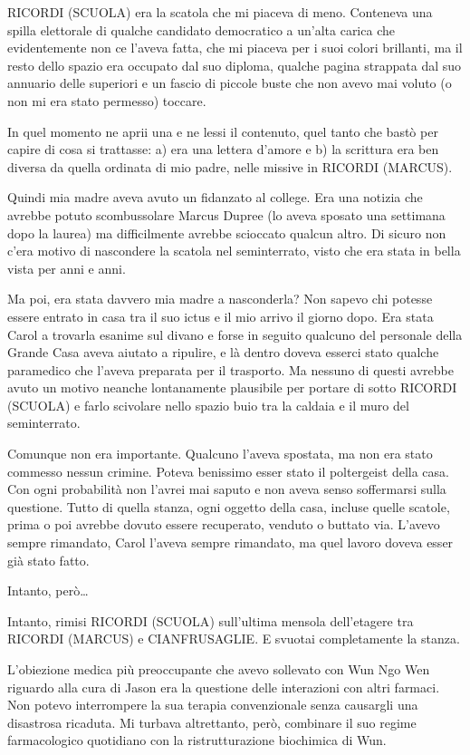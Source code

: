 {RICORDI} ({SCUOLA}) era la scatola che mi piaceva di meno. Conteneva
una spilla elettorale di qualche candidato democratico a un'alta carica
che evidentemente non ce l'aveva fatta, che mi piaceva per i suoi colori
brillanti, ma il resto dello spazio era occupato dal suo diploma,
qualche pagina strappata dal suo annuario delle superiori e un fascio di
piccole buste che non avevo mai voluto (o non mi era stato permesso)
toccare.

In quel momento ne aprii una e ne lessi il contenuto, quel tanto che
bastò per capire di cosa si trattasse: a) era una lettera d'amore e b)
la scrittura era ben diversa da quella ordinata di mio padre, nelle
missive in {RICORDI} ({MARCUS}).

Quindi mia madre aveva avuto un fidanzato al college. Era una notizia
che avrebbe potuto scombussolare Marcus Dupree (lo aveva sposato una
settimana dopo la laurea) ma difficilmente avrebbe scioccato qualcun
altro. Di sicuro non c'era motivo di nascondere la scatola nel
seminterrato, visto che era stata in bella vista per anni e anni.

Ma poi, era stata davvero mia madre a nasconderla? Non sapevo chi
potesse essere entrato in casa tra il suo ictus e il mio arrivo il
giorno dopo. Era stata Carol a trovarla esanime sul divano e forse in
seguito qualcuno del personale della Grande Casa aveva aiutato a
ripulire, e là dentro doveva esserci stato qualche paramedico che
l'aveva preparata per il trasporto. Ma nessuno di questi avrebbe avuto
un motivo neanche lontanamente plausibile per portare di sotto {RICORDI}
({SCUOLA}) e farlo scivolare nello spazio buio tra la caldaia e il muro
del seminterrato.

Comunque non era importante. Qualcuno l'aveva spostata, ma non era stato
commesso nessun crimine. Poteva benissimo esser stato il poltergeist
della casa. Con ogni probabilità non l'avrei mai saputo e non aveva
senso soffermarsi sulla questione. Tutto di quella stanza, ogni oggetto
della casa, incluse quelle scatole, prima o poi avrebbe dovuto essere
recuperato, venduto o buttato via. L'avevo sempre rimandato, Carol
l'aveva sempre rimandato, ma quel lavoro doveva esser già stato fatto.

Intanto, però\ldots{}

Intanto, rimisi {RICORDI} ({SCUOLA}) sull'ultima mensola dell'etagere
tra {RICORDI} (M{ARCUS}) e {CIANFRUSAGLIE}. E svuotai completamente la
stanza.

\separatorefiori

L'obiezione medica più preoccupante che avevo sollevato con Wun Ngo Wen
riguardo alla cura di Jason era la questione delle interazioni con altri
farmaci. Non potevo interrompere la sua terapia convenzionale senza
causargli una disastrosa ricaduta. Mi turbava altrettanto, però,
combinare il suo regime farmacologico quotidiano con la ristrutturazione
biochimica di Wun.

